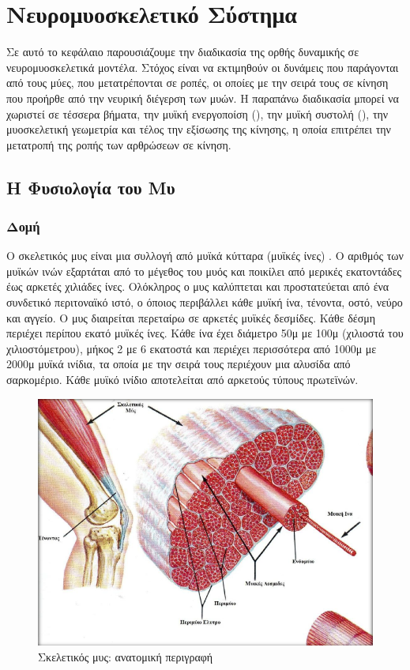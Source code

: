 \chapter{Νευρομυοσκελετικό Σύστημα}

Σε αυτό το κεφάλαιο παρουσιάζουμε την διαδικασία της ορθής δυναμικής σε νευρομυοσκελετικά μοντέλα. Στόχος είναι να εκτιμηθούν οι δυνάμεις που παράγονται από τους μύες, που μετατρέπονται σε  ροπές, οι οποίες με την σειρά τους σε κίνηση που προήρθε από την νευρική διέγερση των μυών. Η παραπάνω διαδικασία μπορεί να χωριστεί σε τέσσερα βήματα, την μυϊκή ενεργοποίση (), την μυϊκή συστολή (), την μυοσκελετική γεωμετρία και τέλος την εξίσωσης της κίνησης, η οποία επιτρέπει την μετατροπή της ροπής των αρθρώσεων σε κίνηση.

\section{H Φυσιολογία του Μυ}

\subsection{Δομή}

Ο σκελετικός μυς είναι μια συλλογή από μυϊκά κύτταρα (μυϊκές ίνες) \cite{zirinoglou}. Ο αριθμός των μυϊκών ινών εξαρτάται από το μέγεθος του μυός και ποικίλει από μερικές εκατοντάδες έως αρκετές χιλιάδες ίνες. Ολόκληρος ο μυς καλύπτεται και προστατεύεται από ένα συνδετικό περιτοναϊκό ιστό, ο όποιος περιβάλλει κάθε μυϊκή ίνα, τένοντα, οστό, νεύρο και αγγείο. Ο μυς διαιρείται περεταίρω σε αρκετές μυϊκές δεσμίδες. Κάθε δέσμη περιέχει περίπου εκατό μυϊκές ίνες. Κάθε ίνα έχει διάμετρο 50μ με 100μ (χιλιοστά του χιλιοστόμετρου), μήκος 2 με 6 εκατοστά και περιέχει περισσότερα από 1000μ με 2000μ μυϊκά ινίδια, τα οποία με την σειρά τους περιέχουν μια αλυσίδα από σαρκομέριο. Κάθε μυϊκό ινίδιο αποτελείται από αρκετούς τύπους πρωτεϊνών.

\begin{figure}[H]
    \centering
    \includegraphics[width=.7\textwidth]{neuromusculoskeletal/fig/muscle-fysiology.png}
    \caption{Σκελετικός μυς: ανατομική περιγραφή\protect\footnotemark}
    \label{fig:muscle-fysiology}
\end{figure}


